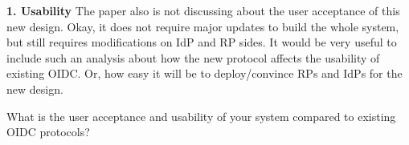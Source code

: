 \documentclass[letterpaper,onecolumn,10pt]{article}
\begin{document}
\noindent\textbf{1. Usability}
The paper also is not discussing about the user acceptance of this new design. Okay, it does not require major updates to build the whole system, but still requires modifications on IdP and RP sides. It would be very useful to include such an analysis about how the new protocol affects the usability of existing OIDC. Or, how easy it will be to deploy/convince RPs and IdPs for the new design.

What is the user acceptance and usability of your system compared to existing OIDC protocols?
\end{document}
